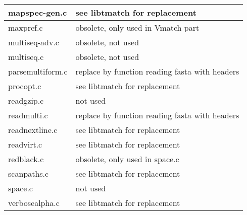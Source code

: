 \documentclass[11pt]{article}
\begin{document}
\begin{tabular}{|l|l|}
mapspec-gen.c & see libtmatch for replacement\\\hline
maxpref.c & obsolete, only used in Vmatch part\\\hline
multiseq-adv.c & obsolete, not used \\\hline
multiseq.c & obsolete, not used \\\hline
parsemultiform.c & replace by function reading fasta with headers\\\hline
procopt.c  & see libtmatch for replacement\\\hline
readgzip.c &  not used\\\hline
readmulti.c & replace by function reading fasta with headers\\\hline
readnextline.c & see libtmatch for replacement\\\hline
readvirt.c  & see libtmatch for replacement\\\hline
redblack.c & obsolete, only used in space.c\\\hline
scanpaths.c & see libtmatch for replacement\\\hline
space.c & not used\\\hline
verbosealpha.c & see libtmatch for replacement\\\hline
\end{tabular}
\end{document}
